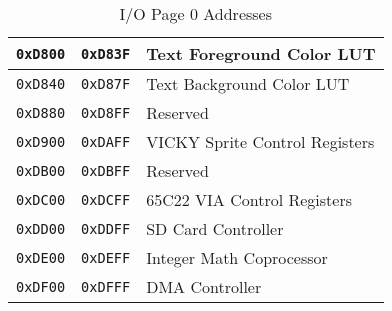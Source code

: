 \begin{table}
\begin{center}
\begin{tabular}{|c|c|l|}
            \verb+0xD800+ & \verb+0xD83F+ & Text Foreground Color LUT \\ \hline
            \verb+0xD840+ & \verb+0xD87F+ & Text Background Color LUT \\ \hline
            \verb+0xD880+ & \verb+0xD8FF+ & Reserved \\ \hline
            \verb+0xD900+ & \verb+0xDAFF+ & VICKY Sprite Control Registers \\ \hline
            \verb+0xDB00+ & \verb+0xDBFF+ & Reserved \\ \hline
            \verb+0xDC00+ & \verb+0xDCFF+ & 65C22 VIA Control Registers \\ \hline
            \verb+0xDD00+ & \verb+0xDDFF+ & SD Card Controller \\ \hline
            \verb+0xDE00+ & \verb+0xDEFF+ & Integer Math Coprocessor \\ \hline
            \verb+0xDF00+ & \verb+0xDFFF+ & DMA Controller \\ \hline
        \end{tabular}
        \caption{I/O Page 0 Addresses}
        \label{tab:io_page_0}
    \end{center}
\end{table}
